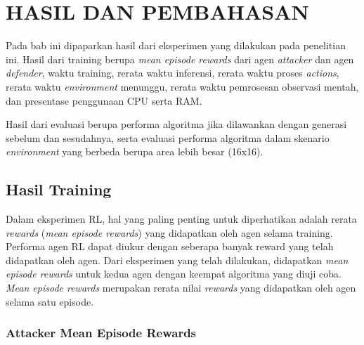 \chapter{HASIL DAN PEMBAHASAN}
\label{chap:hasilpembahasan}

Pada bab ini dipaparkan hasil dari eksperimen yang dilakukan pada penelitian ini.
Hasil dari training berupa \emph{mean episode rewards} dari agen \emph{attacker} dan agen \emph{defender},
waktu training, rerata waktu inferensi, rerata waktu proses \emph{actions}, rerata waktu \emph{environment} menunggu,
rerata waktu pemrosesan observasi mentah, dan presentase penggunaan CPU serta RAM.

Hasil dari evaluasi berupa performa algoritma jika dilawankan dengan generasi sebelum dan sesudahnya,
serta evaluasi performa algoritma dalam skenario \emph{environment} yang berbeda berupa area lebih besar
(16x16).

\section{Hasil Training}

Dalam eksperimen RL, hal yang paling penting untuk diperhatikan adalah rerata \emph{rewards} (\emph{mean episode rewards}) yang didapatkan oleh agen
selama training. Performa agen RL dapat diukur dengan seberapa banyak reward yang telah didapatkan oleh agen.
Dari eksperimen yang telah dilakukan, didapatkan \emph{mean episode rewards} untuk kedua agen dengan keempat algoritma yang diuji coba.
\emph{Mean episode rewards} merupakan rerata nilai \emph{rewards} yang didapatkan oleh agen selama satu episode.

\subsection{Attacker Mean Episode Rewards}

